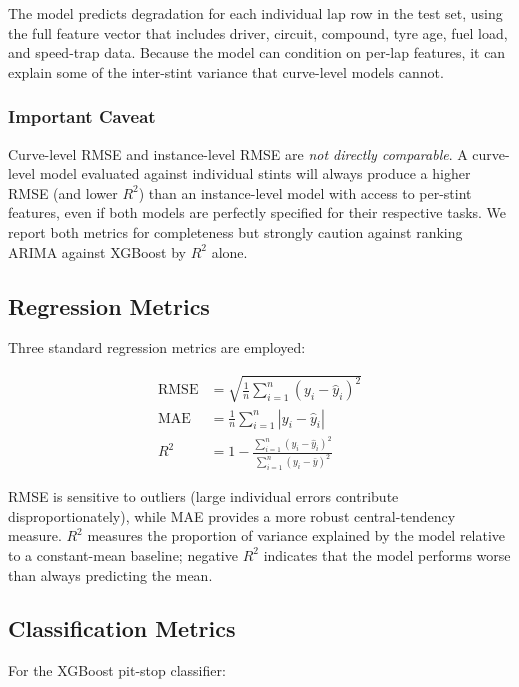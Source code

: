 \documentclass[journal,twoside]{IEEEtran}
\begin{document}
The model predicts degradation for each individual lap row in the test
set, using the full feature vector that includes driver, circuit,
compound, tyre age, fuel load, and speed-trap data.  Because the model
can condition on per-lap features, it can explain some of the
inter-stint variance that curve-level models cannot.

\subsubsection{Important Caveat}

Curve-level RMSE and instance-level RMSE are \emph{not directly
comparable}.  A curve-level model evaluated against individual stints
will always produce a higher RMSE (and lower $R^{2}$) than an
instance-level model with access to per-stint features, even if both
models are perfectly specified for their respective tasks.  We report
both metrics for completeness but strongly caution against ranking ARIMA
against XGBoost by $R^{2}$ alone.

\subsection{Regression Metrics}

Three standard regression metrics are employed:

\begin{align}
  \text{RMSE} &= \sqrt{\frac{1}{n}\sum_{i=1}^{n}(y_i - \hat{y}_i)^2}
  \label{eq:rmse} \\[4pt]
  \text{MAE}  &= \frac{1}{n}\sum_{i=1}^{n}|y_i - \hat{y}_i|
  \label{eq:mae} \\[4pt]
  R^{2} &= 1 - \frac{\sum_{i=1}^{n}(y_i - \hat{y}_i)^2}
  {\sum_{i=1}^{n}(y_i - \bar{y})^2}
  \label{eq:r2}
\end{align}

RMSE is sensitive to outliers (large individual errors contribute
disproportionately), while MAE provides a more robust central-tendency
measure.  $R^{2}$ measures the proportion of variance explained by
the model relative to a constant-mean baseline; negative $R^{2}$
indicates that the model performs worse than always predicting the
mean.

\subsection{Classification Metrics}

For the XGBoost pit-stop classifier:
\end{document}
